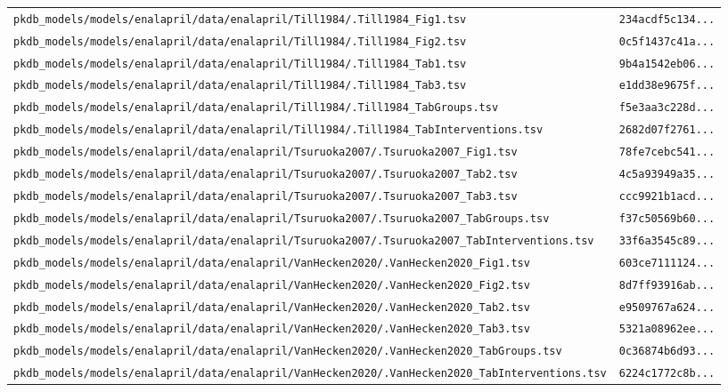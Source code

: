 \begin{longtable}{ll}
\texttt{pkdb\_models/models/enalapril/data/enalapril/Till1984/.Till1984\_Fig1.tsv} & \texttt{234acdf5c134...} \\
\texttt{pkdb\_models/models/enalapril/data/enalapril/Till1984/.Till1984\_Fig2.tsv} & \texttt{0c5f1437c41a...} \\
\texttt{pkdb\_models/models/enalapril/data/enalapril/Till1984/.Till1984\_Tab1.tsv} & \texttt{9b4a1542eb06...} \\
\texttt{pkdb\_models/models/enalapril/data/enalapril/Till1984/.Till1984\_Tab3.tsv} & \texttt{e1dd38e9675f...} \\
\texttt{pkdb\_models/models/enalapril/data/enalapril/Till1984/.Till1984\_TabGroups.tsv} & \texttt{f5e3aa3c228d...} \\
\texttt{pkdb\_models/models/enalapril/data/enalapril/Till1984/.Till1984\_TabInterventions.tsv} & \texttt{2682d07f2761...} \\
\texttt{pkdb\_models/models/enalapril/data/enalapril/Tsuruoka2007/.Tsuruoka2007\_Fig1.tsv} & \texttt{78fe7cebc541...} \\
\texttt{pkdb\_models/models/enalapril/data/enalapril/Tsuruoka2007/.Tsuruoka2007\_Tab2.tsv} & \texttt{4c5a93949a35...} \\
\texttt{pkdb\_models/models/enalapril/data/enalapril/Tsuruoka2007/.Tsuruoka2007\_Tab3.tsv} & \texttt{ccc9921b1acd...} \\
\texttt{pkdb\_models/models/enalapril/data/enalapril/Tsuruoka2007/.Tsuruoka2007\_TabGroups.tsv} & \texttt{f37c50569b60...} \\
\texttt{pkdb\_models/models/enalapril/data/enalapril/Tsuruoka2007/.Tsuruoka2007\_TabInterventions.tsv} & \texttt{33f6a3545c89...} \\
\texttt{pkdb\_models/models/enalapril/data/enalapril/VanHecken2020/.VanHecken2020\_Fig1.tsv} & \texttt{603ce7111124...} \\
\texttt{pkdb\_models/models/enalapril/data/enalapril/VanHecken2020/.VanHecken2020\_Fig2.tsv} & \texttt{8d7ff93916ab...} \\
\texttt{pkdb\_models/models/enalapril/data/enalapril/VanHecken2020/.VanHecken2020\_Tab2.tsv} & \texttt{e9509767a624...} \\
\texttt{pkdb\_models/models/enalapril/data/enalapril/VanHecken2020/.VanHecken2020\_Tab3.tsv} & \texttt{5321a08962ee...} \\
\texttt{pkdb\_models/models/enalapril/data/enalapril/VanHecken2020/.VanHecken2020\_TabGroups.tsv} & \texttt{0c36874b6d93...} \\
\texttt{pkdb\_models/models/enalapril/data/enalapril/VanHecken2020/.VanHecken2020\_TabInterventions.tsv} & \texttt{6224c1772c8b...} \\

\end{longtable}
